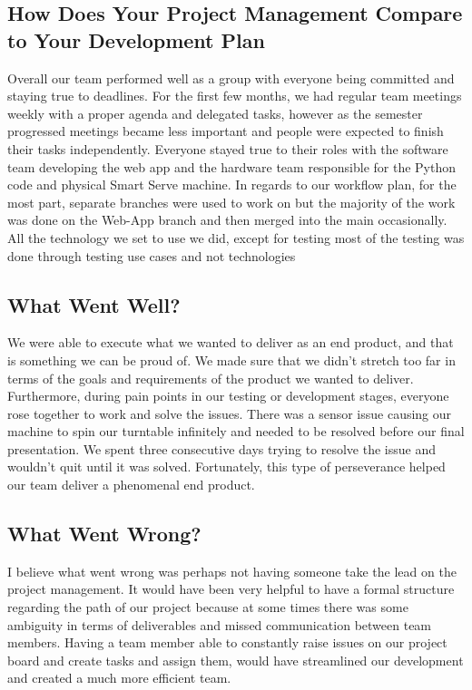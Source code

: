 \documentclass{article}
\begin{document}
\subsection{How Does Your Project Management Compare to Your Development Plan}

Overall our team performed well as a group with everyone being committed and staying true to deadlines. For the first few months, we had regular team meetings weekly with a proper agenda and delegated tasks, however as the semester progressed meetings became less important and people were expected to finish their tasks independently. Everyone stayed true to their roles with the software team developing the web app and the hardware team responsible for the Python code and physical Smart Serve machine. In regards to our workflow plan, for the most part, separate branches were used to work on but the majority of the work was done on the Web-App branch and then merged into the main occasionally. All the technology we set to use we did, except for testing most of the testing was done through testing use cases and not technologies\\

\subsection{What Went Well?}
We were able to execute what we wanted to deliver as an end product, and that is something we can be proud of. We made sure that we didn't stretch too far in terms of the goals and requirements of the product we wanted to deliver. Furthermore, during pain points in our testing or development stages, everyone rose together to work and solve the issues. There was a sensor issue causing our machine to spin our turntable infinitely and needed to be resolved before our final presentation. We spent three consecutive days trying to resolve the issue and wouldn't quit until it was solved. Fortunately, this type of perseverance helped our team deliver a phenomenal end product. 

\subsection{What Went Wrong?}
I believe what went wrong was perhaps not having someone take the lead on the project management. It would have been very helpful to have a formal structure regarding the path of our project because at some times there was some ambiguity in terms of deliverables and missed communication between team members. Having a team member able to constantly raise issues on our project board and create tasks and assign them, would have streamlined our development and created a much more efficient team.
\end{document}
